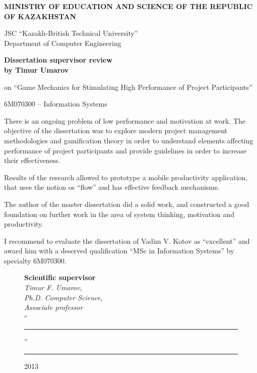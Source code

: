 \pagebreak
\thispagestyle{empty}
\begin{centering}
{\bf{\MakeUppercase{Ministry of education and science of the republic of Kazakhstan}}

\vspace{14pt}

JSC ``Kazakh-British Technical University''\\
Department of Computer Engineering}
\vspace{14pt}

{\bf
Dissertation supervisor review\\
by Timur Umarov
}

on ``Game Mechanics for Stimulating High Performance of Project Participants''

\vspace{14pt}
\small 6M070300 -- Information Systems

\end{centering}


There is an ongoing problem of low performance and motivation at work. The objective of the dissertation was to explore modern project management methodologies and gamification theory in order to understand elements affecting performance of project participants and provide guidelines in order to increase their effectiveness.

Results of the research allowed to prototype a mobile productivity application, that uses the notion os ``flow'' and has effective feedback mechanisms.

The author of the master dissertation did a solid work, and constructed a good foundation on further work in the area of system thinking, motivation and productivity.

I recommend to evaluate the dissertation of Vadim V. Kotov as ``excellent'' and award him with a deserved qualification ``MSc in Information Systems'' by specialty 6M070300.


\begin{figure}[ht]
\begin{minipage}[t]{0.6\linewidth}
{\bf Scientific supervisor}\\

{\em Timur F. Umarov,\\
Ph.D. Computer Science,\\
Associate professor}\\

``\rule{2em}{0.4pt}'' \rule{8em}{0.4pt} 2013\\
\end{minipage}
\end{figure}

